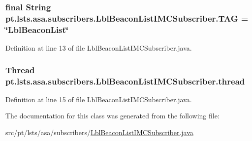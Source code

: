 \subsubsection[{T\+A\+G}]{\setlength{\rightskip}{0pt plus 5cm}final String pt.\+lsts.\+asa.\+subscribers.\+Lbl\+Beacon\+List\+I\+M\+C\+Subscriber.\+T\+A\+G = \char`\"{}Lbl\+Beacon\+List\char`\"{}\hspace{0.3cm}{\ttfamily [static]}}\label{classpt_1_1lsts_1_1asa_1_1subscribers_1_1LblBeaconListIMCSubscriber_a32c2d10354ceba194c068d3acd295d5e}


Definition at line 13 of file Lbl\+Beacon\+List\+I\+M\+C\+Subscriber.\+java.

\hypertarget{classpt_1_1lsts_1_1asa_1_1subscribers_1_1LblBeaconListIMCSubscriber_a4f908fdfeaca91b999f52703b716ffb7}{}
\subsubsection[{thread}]{\setlength{\rightskip}{0pt plus 5cm}Thread pt.\+lsts.\+asa.\+subscribers.\+Lbl\+Beacon\+List\+I\+M\+C\+Subscriber.\+thread\hspace{0.3cm}{\ttfamily [private]}}\label{classpt_1_1lsts_1_1asa_1_1subscribers_1_1LblBeaconListIMCSubscriber_a4f908fdfeaca91b999f52703b716ffb7}


Definition at line 15 of file Lbl\+Beacon\+List\+I\+M\+C\+Subscriber.\+java.



The documentation for this class was generated from the following file\+:\begin{DoxyCompactItemize}
\item 
src/pt/lsts/asa/subscribers/\hyperlink{LblBeaconListIMCSubscriber_8java}{Lbl\+Beacon\+List\+I\+M\+C\+Subscriber.\+java}\end{DoxyCompactItemize}
